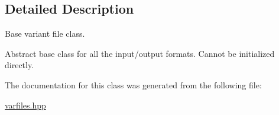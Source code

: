 \subsection{Detailed Description}
Base variant file class. 

Abstract base class for all the input/output formats. Cannot be initialized directly. 

The documentation for this class was generated from the following file\+:\begin{DoxyCompactItemize}
\item 
\hyperlink{varfiles_8hpp}{varfiles.\+hpp}\end{DoxyCompactItemize}
